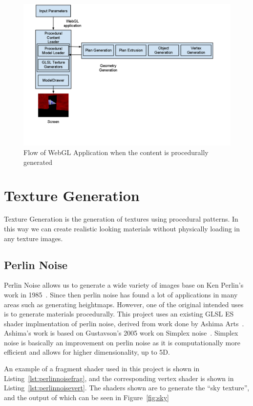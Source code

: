 \begin{figure}
  \centering
  \includegraphics[width=1.0\textwidth]{images/gwtproc_procgenflow}
  \caption{Flow of WebGL Application when the content is procedurally generated}
  \label{fig:procgenflow}
\end{figure}

\section{Texture Generation}
\label{sec:texgen}
Texture Generation is the generation of textures using procedural patterns.
In this way we can create realistic looking materials without physically loading in any texture images.

\subsection{Perlin Noise}
Perlin Noise allows us to generate a wide variety of images base on Ken Perlin's work in 1985~\cite{Perlin:1985:IS:325165.325247}.
Since then perlin noise has found a lot of applications in many areas such as generating heightmaps.
However, one of the original intended uses is to generate materials procedurally.
This project uses an existing GLSL ES shader implmentation of perlin noise, derived from work done by Ashima Arts~\cite{web:webglnoise}.
Ashima's work is based on Gustavson's 2005 work on Simplex noise~\cite{gustavson2005simplex}.
Simplex noise is basically an improvement on perlin noise as it is computationally more efficient and allows for higher dimensionality, up to 5D.

An example of a fragment shader used in this project is shown in Listing~\ref{lst:perlinnoisefrag}, and the corresponding vertex shader is shown in Listing~\ref{lst:perlinnoisevert}.
The shaders shown are to generate the ``sky texture'', and the output of which can be seen in Figure~\ref{fig:sky}

